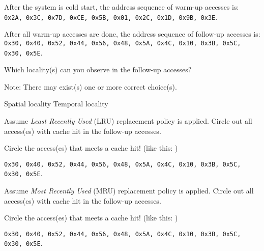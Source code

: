 \begin{questions}
After the system is cold start, the address sequence of warm-up
accesses is:\\
\texttt{0x2A, 0x3C, 0x7D, 0xCE, 0x5B, 0x01, 0x2C, 0x1D, 0x9B, 0x3E}.

After all warm-up accesses are done, the address sequence of
follow-up accesses is: \\
\texttt{0x30, 0x40, 0x52, 0x44, 0x56, 0x48, 0x5A, 0x4C, 0x10, 0x3B,
0x5C, 0x30, 0x5E}.

\question[2] Which locality(s) can you observe in the follow-up
accesses?

{

    \begin{solution}
        Note: There may exist(s) one or more correct choice(s).\\
        \begin{oneparcheckboxes}
            \choice Spatial locality
            \choice Temporal locality
        \end{oneparcheckboxes}
    \end{solution}

}

\question[2] Assume \emph{Least Recently Used} (LRU) replacement
policy is applied. Circle out all access(es) with cache hit in
the follow-up accesses. \label{q:lru}

{
    \begin{solution}
        Circle the access(es) that meets a cache hit!
        (like this: \texttt{})\\
        \begin{center}
        \texttt{0x30, 0x40, 0x52, 0x44, 0x56, 0x48, 0x5A, 0x4C, 0x10,
        0x3B, 0x5C, 0x30, 0x5E}.
        \end{center}
        \vspace{10px}
    \end{solution}
}

\question[2] Assume \emph{Most Recently Used} (MRU) replacement policy
is applied. Circle out all access(es) with cache hit in the follow-up
accesses. \label{q:mru}

{
    \begin{solution}
        Circle the access(es) that meets a cache hit!
        (like this: \texttt{})\\
        \begin{center}
        \texttt{0x30, 0x40, 0x52, 0x44, 0x56, 0x48, 0x5A, 0x4C, 0x10,
        0x3B, 0x5C, 0x30, 0x5E}.
        \end{center}
        \vspace{10px}
    \end{solution}
}


\end{questions}
